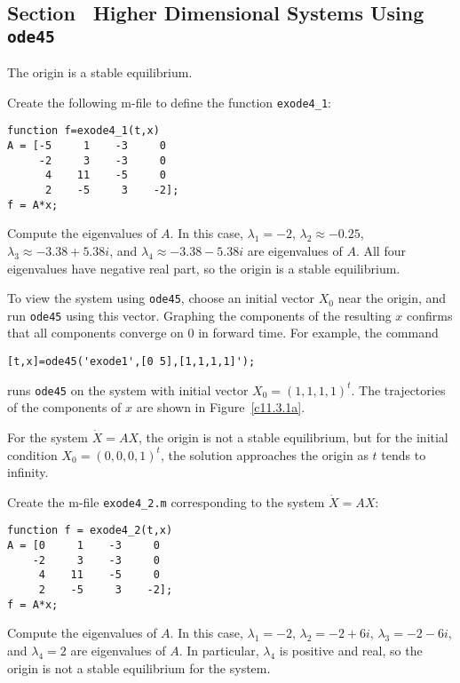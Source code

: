 \documentclass{ximera}
\begin{document}
\subsection*{Section~\protect{\ref{S:ode45HD}} Higher Dimensional Systems Using 
{\tt ode45}}

\ans The origin is a stable equilibrium.

\soln Create the following m-file to define the function {\tt exode4\_1}:
\begin{verbatim}
function f=exode4_1(t,x)
A = [-5     1    -3     0
     -2     3    -3     0
      4    11    -5     0
      2    -5     3    -2];
f = A*x;
\end{verbatim}
Compute the eigenvalues of $A$.  In this case, $\lambda_1 = -2$, $\lambda_2
\approx -0.25$, $\lambda_3 \approx -3.38 + 5.38i$, and $\lambda_4 \approx
-3.38 - 5.38i$ are eigenvalues of $A$.  All four eigenvalues have negative
real part, so the origin is a stable equilibrium.

\para To view the system using {\tt ode45}, choose an initial vector $X_0$
near the origin, and run {\tt ode45} using this vector.  Graphing the
components of the resulting $x$ confirms that all components converge on $0$
in forward time.  For example, the command
\begin{verbatim}
[t,x]=ode45('exode1',[0 5],[1,1,1,1]');
\end{verbatim}
runs {\tt ode45} on the system with initial vector $X_0 = (1,1,1,1)^t$.
The trajectories of the components of $x$ are shown in Figure~\ref{c11.3.1a}.

\begin{figure}[htb]
                       \centerline{%
                       }
\end{figure}

\ans For the system $\dot{X} = AX$, the origin is not a stable
equilibrium, but for the initial condition $X_0 = (0,0,0,1)^t$, the
solution approaches the origin as $t$ tends to infinity.

\soln Create the m-file {\tt exode4\_2.m} corresponding to the system 
$\dot{X} = AX$:
\begin{verbatim}
function f = exode4_2(t,x)
A = [0     1    -3     0
    -2     3    -3     0
     4    11    -5     0
     2    -5     3    -2];
f = A*x;
\end{verbatim}
Compute the eigenvalues of $A$.  In this case, $\lambda_1 = -2$, $\lambda_2
= -2 + 6i$, $\lambda_3 = -2 - 6i$, and $\lambda_4 = 2$ are eigenvalues of
$A$.  In particular, $\lambda_4$ is positive and real, so the origin is not
a stable equilibrium for the system.
\end{document}

